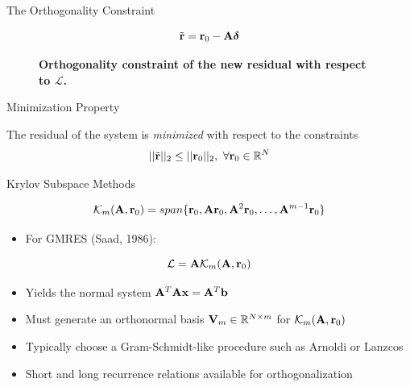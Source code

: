 \documentclass{beamer}
\begin{document}
\begin{frame}{The Orthogonality Constraint}

  \[
  \tilde{\mathbf{r}} = \mathbf{r}_0 - \mathbf{A}\boldsymbol{\delta}
  \]

  \begin{figure}[htpb!]
    \begin{center}
      \scalebox{1.1}{  }
    \end{center}
    \caption{\textbf{Orthogonality constraint of the new residual with
        respect to $\mathcal{L}$.}}
  \end{figure}

  \pause
  \begin{beamerboxesrounded}[upper=boxheadcolor,lower=boxbodycolor,shadow=true]
    {Minimization Property}

    The residual of the system is \textit{minimized} with respect to
    the constraints
    \[
    ||\tilde{\mathbf{r}}||_2 \leq ||\mathbf{r}_0||_2,\ \forall \mathbf{r}_0 \in
    \mathbb{R}^N
    \]
  \end{beamerboxesrounded}

\end{frame}

\begin{frame}{Krylov Subspace Methods}

  \[
  \mathcal{K}_m(\mathbf{A},\mathbf{r}_0) = span\{\mathbf{r}_0, \mathbf{A}\mathbf{r}_0,
  \mathbf{A}^2\mathbf{r}_0, \dots, \mathbf{A}^{m-1}\mathbf{r}_0\}
  \]

  \begin{itemize}
  \item For GMRES (Saad, 1986):
  \end{itemize}
  \[
  \mathcal{L} = \mathbf{A} \mathcal{K}_m(\mathbf{A},\mathbf{r}_0)
  \]

  \begin{itemize}
  \item Yields the normal system $\mathbf{A}^T\mathbf{A}\mathbf{x} =
    \mathbf{A}^T\mathbf{b}$
  \item Must generate an orthonormal basis $\mathbf{V}_m \in \mathbb{R}^{N
    \times m}$ for $\mathcal{K}_m(\mathbf{A},\mathbf{r}_0)$
  \item Typically choose a Gram-Schmidt-like procedure such as Arnoldi
    or Lanzcos
  \item Short and long recurrence relations available for
    orthogonalization
  \end{itemize}

\end{frame}
\end{document}
